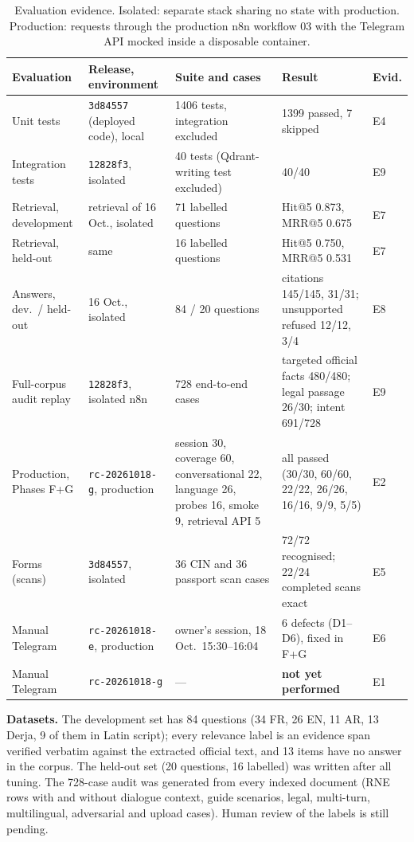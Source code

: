 \documentclass[10pt,a4paper]{article}
\newcommand{\code}[1]{\texttt{\small #1}}
\begin{document}
\begin{table}[H]
  \centering\footnotesize
  \caption{Evaluation evidence. Isolated: separate stack sharing no state with production. Production: requests
  through the production n8n workflow 03 with the Telegram API mocked inside a disposable container.}\label{tab:eval}
  \begin{tabularx}{\textwidth}{@{}P{2.7cm} P{3.0cm} Y P{3.5cm} l@{}}
  \toprule
  Evaluation & Release, environment & Suite and cases & Result & Evid. \\
  \midrule
  Unit tests & \code{3d84557} (deployed code), local & 1406 tests, integration excluded & 1399 passed, 7 skipped & E4 \\
  Integration tests & \code{12828f3}, isolated & 40 tests (Qdrant-writing test excluded) & 40/40 & E9 \\
  Retrieval, development & retrieval of 16 Oct., isolated & 71 labelled questions & Hit@5 0.873, MRR@5 0.675 & E7 \\
  Retrieval, held-out & same & 16 labelled questions & Hit@5 0.750, MRR@5 0.531 & E7 \\
  Answers, dev.\ / held-out & 16 Oct., isolated & 84 / 20 questions & citations 145/145, 31/31; unsupported refused 12/12, 3/4 & E8 \\
  Full-corpus audit replay & \code{12828f3}, isolated n8n & 728 end-to-end cases & targeted official facts 480/480; legal passage 26/30; intent 691/728 & E9 \\
  Production, Phases F+G & \code{rc-20261018-g}, production & session 30, coverage 60, conversational 22, language 26, probes 16, smoke 9, retrieval API 5 & all passed (30/30, 60/60, 22/22, 26/26, 16/16, 9/9, 5/5) & E2 \\
  Forms (scans) & \code{3d84557}, isolated & 36 CIN and 36 passport scan cases & 72/72 recognised; 22/24 completed scans exact & E5 \\
  Manual Telegram & \code{rc-20261018-e}, production & owner's session, 18 Oct.\ 15:30--16:04 & 6 defects (D1--D6), fixed in F+G & E6 \\
  Manual Telegram & \code{rc-20261018-g} & --- & \textbf{not yet performed} & E1 \\
  \bottomrule
  \end{tabularx}
\end{table}

\textbf{Datasets.} The development set has 84 questions (34 FR, 26 EN, 11 AR, 13 Derja, 9 of them in Latin
script); every relevance label is an evidence span verified verbatim against the extracted official text, and
13 items have no answer in the corpus. The held-out set (20 questions, 16 labelled) was written after all
tuning. The 728-case audit was generated from every indexed document (RNE rows with and without dialogue
context, guide scenarios, legal, multi-turn, multilingual, adversarial and upload cases). Human review of the
labels is still pending.
\end{document}
